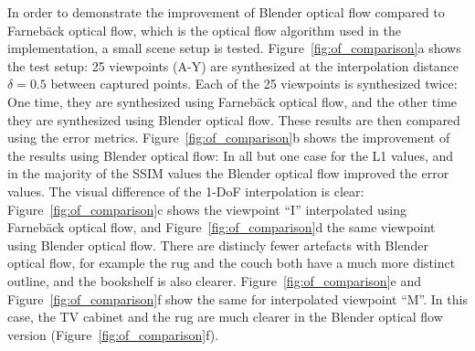 In order to demonstrate the improvement of Blender optical flow compared to Farneb\"ack optical flow, which is the optical flow algorithm used in the implementation, a small scene setup is tested. Figure~\ref{fig:of_comparison}a shows the test setup: 25 viewpoints (A-Y) are synthesized at the interpolation distance $\delta = 0.5$ between captured points. Each of the 25 viewpoints is synthesized twice: One time, they are synthesized using Farneb\"ack optical flow, and the other time they are synthesized using Blender optical flow. These results are then compared using the error metrics.
Figure~\ref{fig:of_comparison}b shows the improvement of the results using Blender optical flow: In all but one case for the L1 values, and in the majority of the SSIM values the Blender optical flow improved the error values. The visual difference of the 1-DoF interpolation is clear: Figure~\ref{fig:of_comparison}c shows the viewpoint ``I'' interpolated using Farneb\"ack optical flow, and Figure~\ref{fig:of_comparison}d the same viewpoint using Blender optical flow. There are distincly fewer artefacts with Blender optical flow, for example the rug and the couch both have a much more distinct outline, and the bookshelf is also clearer. Figure~\ref{fig:of_comparison}e and Figure~\ref{fig:of_comparison}f show the same for interpolated viewpoint ``M''. In this case, the TV cabinet and the rug are much clearer in the Blender optical flow version (Figure~\ref{fig:of_comparison}f).

